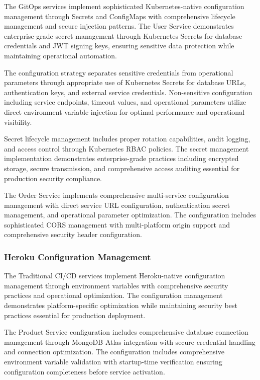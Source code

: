 The GitOps services implement sophisticated Kubernetes-native configuration management through Secrets and ConfigMaps with comprehensive lifecycle management and secure injection patterns. The User Service demonstrates enterprise-grade secret management through Kubernetes Secrets for database credentials and JWT signing keys, ensuring sensitive data protection while maintaining operational automation.

The configuration strategy separates sensitive credentials from operational parameters through appropriate use of Kubernetes Secrets for database URLs, authentication keys, and external service credentials. Non-sensitive configuration including service endpoints, timeout values, and operational parameters utilize direct environment variable injection for optimal performance and operational visibility.

Secret lifecycle management includes proper rotation capabilities, audit logging, and access control through Kubernetes RBAC policies. The secret management implementation demonstrates enterprise-grade practices including encrypted storage, secure transmission, and comprehensive access auditing essential for production security compliance.

The Order Service implements comprehensive multi-service configuration management with direct service URL configuration, authentication secret management, and operational parameter optimization. The configuration includes sophisticated CORS management with multi-platform origin support and comprehensive security header configuration.

\subsubsection{Heroku Configuration Management}

The Traditional CI/CD services implement Heroku-native configuration management through environment variables with comprehensive security practices and operational optimization. The configuration management demonstrates platform-specific optimization while maintaining security best practices essential for production deployment.

The Product Service configuration includes comprehensive database connection management through MongoDB Atlas integration with secure credential handling and connection optimization. The configuration includes comprehensive environment variable validation with startup-time verification ensuring configuration completeness before service activation.

